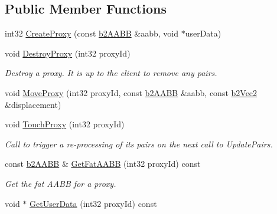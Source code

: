 \subsection*{Public Member Functions}
\begin{DoxyCompactItemize}
\item 
int32 \hyperlink{classb2_broad_phase_ae2f7af756bc55ece45221466c5af449c}{Create\+Proxy} (const \hyperlink{structb2_a_a_b_b}{b2\+A\+A\+BB} \&aabb, void $\ast$user\+Data)
\item 
\mbox{\label{classb2_broad_phase_a84f0fb227dc01a9b9baa55c7b8c68984}} 
void \hyperlink{classb2_broad_phase_a84f0fb227dc01a9b9baa55c7b8c68984}{Destroy\+Proxy} (int32 proxy\+Id)
\begin{DoxyCompactList}\small\item\em Destroy a proxy. It is up to the client to remove any pairs. \end{DoxyCompactList}\item 
void \hyperlink{classb2_broad_phase_a01dc18a19c2b5d0cc1d9cd8c8554234c}{Move\+Proxy} (int32 proxy\+Id, const \hyperlink{structb2_a_a_b_b}{b2\+A\+A\+BB} \&aabb, const \hyperlink{structb2_vec2}{b2\+Vec2} \&displacement)
\item 
\mbox{\label{classb2_broad_phase_a67b296431ebbc7b44037f21d645d9166}} 
void \hyperlink{classb2_broad_phase_a67b296431ebbc7b44037f21d645d9166}{Touch\+Proxy} (int32 proxy\+Id)
\begin{DoxyCompactList}\small\item\em Call to trigger a re-\/processing of it\textquotesingle{}s pairs on the next call to Update\+Pairs. \end{DoxyCompactList}\item 
\mbox{\label{classb2_broad_phase_af5c47c036ca67d44676ea3cec73ae3d8}} 
const \hyperlink{structb2_a_a_b_b}{b2\+A\+A\+BB} \& \hyperlink{classb2_broad_phase_af5c47c036ca67d44676ea3cec73ae3d8}{Get\+Fat\+A\+A\+BB} (int32 proxy\+Id) const
\begin{DoxyCompactList}\small\item\em Get the fat A\+A\+BB for a proxy. \end{DoxyCompactList}\item 
\mbox{\label{classb2_broad_phase_a3b85893e3cf18b43087cb96b0b9076d1}} 
void $\ast$ \hyperlink{classb2_broad_phase_a3b85893e3cf18b43087cb96b0b9076d1}{Get\+User\+Data} (int32 proxy\+Id) const

\end{DoxyCompactItemize}
